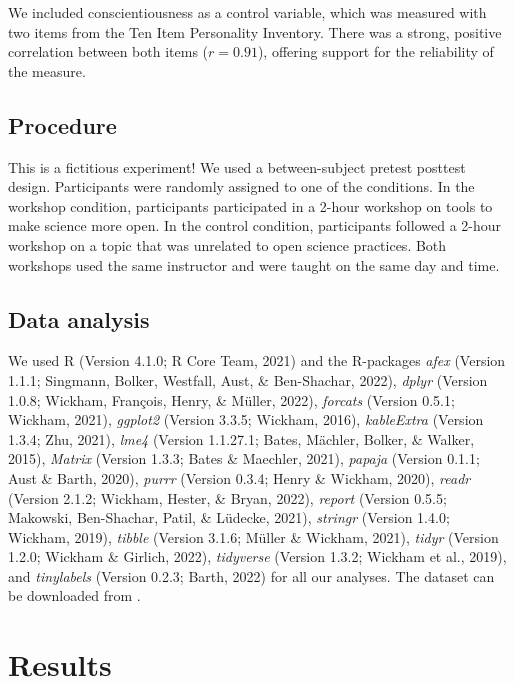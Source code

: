 \documentclass[
  man]{apa6}
\begin{document}
We included conscientiousness as a control variable, which was measured with two items from the Ten Item Personality Inventory.
There was a strong, positive correlation between both items (\(r = 0.91\)), offering support for the reliability of the measure.

\hypertarget{procedure}{%
\subsection{Procedure}\label{procedure}}

This is a fictitious experiment!
We used a between-subject pretest posttest design.
Participants were randomly assigned to one of the conditions.
In the workshop condition, participants participated in a 2-hour workshop on tools to make science more open.
In the control condition, participants followed a 2-hour workshop on a topic that was unrelated to open science practices.
Both workshops used the same instructor and were taught on the same day and time.

\hypertarget{data-analysis}{%
\subsection{Data analysis}\label{data-analysis}}

We used R (Version 4.1.0; R Core Team, 2021) and the R-packages \emph{afex} (Version 1.1.1; Singmann, Bolker, Westfall, Aust, \& Ben-Shachar, 2022), \emph{dplyr} (Version 1.0.8; Wickham, François, Henry, \& Müller, 2022), \emph{forcats} (Version 0.5.1; Wickham, 2021), \emph{ggplot2} (Version 3.3.5; Wickham, 2016), \emph{kableExtra} (Version 1.3.4; Zhu, 2021), \emph{lme4} (Version 1.1.27.1; Bates, Mächler, Bolker, \& Walker, 2015), \emph{Matrix} (Version 1.3.3; Bates \& Maechler, 2021), \emph{papaja} (Version 0.1.1; Aust \& Barth, 2020), \emph{purrr} (Version 0.3.4; Henry \& Wickham, 2020), \emph{readr} (Version 2.1.2; Wickham, Hester, \& Bryan, 2022), \emph{report} (Version 0.5.5; Makowski, Ben-Shachar, Patil, \& Lüdecke, 2021), \emph{stringr} (Version 1.4.0; Wickham, 2019), \emph{tibble} (Version 3.1.6; Müller \& Wickham, 2021), \emph{tidyr} (Version 1.2.0; Wickham \& Girlich, 2022), \emph{tidyverse} (Version 1.3.2; Wickham et al., 2019), and \emph{tinylabels} (Version 0.2.3; Barth, 2022) for all our analyses. The dataset can be downloaded from .

\hypertarget{results}{%
\section{Results}\label{results}}
\end{document}
